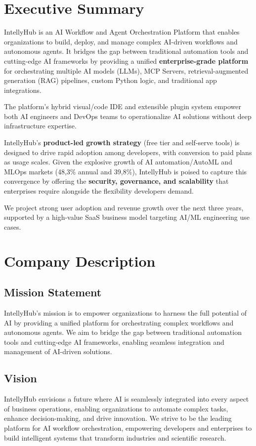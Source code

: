 
\section{Executive Summary}
IntellyHub is an AI Workflow and Agent Orchestration Platform that enables organizations to build, deploy, and manage complex AI-driven workflows and autonomous agents. It bridges the gap between traditional automation tools and cutting-edge AI frameworks by providing a unified \textbf{enterprise-grade platform} for orchestrating multiple AI models (LLMs), MCP Servers, retrieval-aug\-ment\-ed generation (RAG) pipelines, custom Python logic, and traditional app integrations. 

The platform's hybrid visual/code IDE and extensible plugin system empower both AI engineers and DevOps teams to operationalize AI solutions without deep infrastructure expertise. 

IntellyHub's \textbf{product-led growth strategy} (free tier and self-serve tools) is designed to drive rapid adoption among developers, with conversion to paid plans as usage scales. Given the explosive growth of AI automation/AutoML and MLOps markets (48,3\% annual\cite{AIMarket} and 39,8\%\cite{MLOpsMarket}), IntellyHub is poised to capture this convergence by offering the \textbf{security, governance, and scalability} that enterprises require alongside the flexibility developers demand.

We project strong user adoption and revenue growth over the next three years, supported by a high-value SaaS business model targeting AI/ML engineering use cases.

\section{Company Description}
\subsection{Mission Statement}
IntellyHub's mission is to empower organizations to harness the full potential of AI by providing a unified platform for orchestrating complex workflows and autonomous agents. We aim to bridge the gap between traditional automation tools and cutting-edge AI frameworks, enabling seamless integration and management of AI-driven solutions.

\subsection{Vision}
IntellyHub envisions a future where AI is seamlessly integrated into every aspect of business operations, enabling organizations to automate complex tasks, enhance decision-making, and drive innovation. We strive to be the leading platform for AI workflow orchestration, empowering developers and enterprises to build intelligent systems that transform industries and scientific research.

